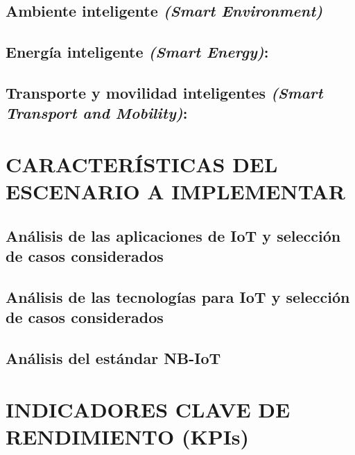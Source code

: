 \subsection{Ambiente inteligente \textit{(Smart Environment)}}
\subsection{Energía inteligente \textit{(Smart Energy)}:}
\subsection{Transporte y movilidad inteligentes \textit{(Smart Transport and Mobility)}:}


\section{CARACTERÍSTICAS DEL ESCENARIO A IMPLEMENTAR}
\subsection{Análisis de las aplicaciones de IoT y selección de casos considerados}
\subsection{Análisis de las tecnologías para IoT y selección de casos considerados}
\subsection{Análisis del estándar NB-IoT}


\section{INDICADORES CLAVE DE RENDIMIENTO (KPIs)}


